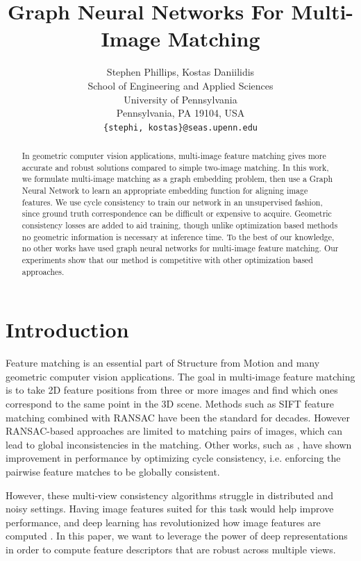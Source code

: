 \documentclass{article} %
\title{Graph Neural Networks For Multi-Image Matching}
\author{Stephen Phillips, Kostas Daniilidis \\
School of Engineering and Applied Sciences \\
University of Pennsylvania \\
Pennsylvania, PA 19104, USA \\
\texttt{\{stephi, kostas\}@seas.upenn.edu} \\
}
\begin{document}
\maketitle

\begin{abstract}
    In geometric computer vision applications, multi-image feature matching gives more accurate and robust solutions compared to simple two-image matching.
    In this work, we formulate multi-image matching as a graph embedding problem, then use a Graph Neural Network to learn an appropriate embedding function for aligning image features.
    We use cycle consistency to train our network in an unsupervised fashion, since ground truth correspondence can be difficult or expensive to acquire.
    Geometric consistency losses are added to aid training, though unlike optimization based methods no geometric information is necessary at inference time.
    To the best of our knowledge, no other works have used graph neural networks for multi-image feature matching.
    Our experiments show that our method is competitive with other optimization based approaches.
\end{abstract}

\section{Introduction}

Feature matching is an essential part of Structure from Motion and many geometric computer vision applications.
The goal in multi-image feature matching is to take 2D feature positions from three or more images and find which ones correspond to the same point in the 3D scene.
Methods such as SIFT feature matching \citep{lowe2004distinctive} combined with RANSAC \citep{fischler1981random} have been the standard for decades.
However RANSAC-based approaches are limited to matching pairs of images, which can lead to global inconsistencies in the matching.
Other works, such as \cite{wang2018multi}, have shown improvement in performance by optimizing cycle consistency, i.e. enforcing the pairwise feature matches to be globally consistent.

However, these multi-view consistency algorithms struggle in distributed and noisy settings.
Having image features suited for this task would help improve performance, and deep learning has revolutionized how image features are computed \citep{yi2016lift}.
In this paper, we want to leverage the power of deep representations in order to compute feature descriptors that are robust across multiple views.
\end{document}
